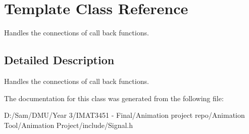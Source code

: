 \hypertarget{class_template}{}\section{Template Class Reference}
\label{class_template}


Handles the connections of call back functions.  




\subsection{Detailed Description}
Handles the connections of call back functions. 

The documentation for this class was generated from the following file\+:\begin{DoxyCompactItemize}
\item 
D\+:/\+Sam/\+D\+M\+U/\+Year 3/\+I\+M\+A\+T3451 -\/ Final/\+Animation project repo/\+Animation Tool/\+Animation Project/include/Signal.\+h\end{DoxyCompactItemize}

